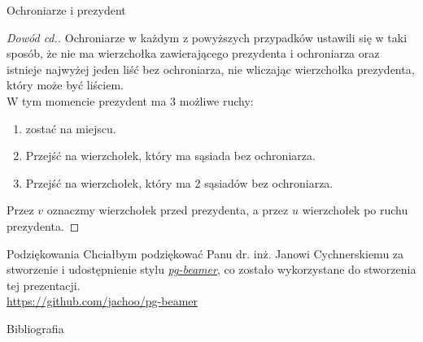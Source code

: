\documentclass[polish]{beamer}
\begin{document}
\begin{frame}{Ochroniarze i prezydent}
    \begin{proof}[Dowód cd.]
        \renewcommand{\qedsymbol}{}
        Ochroniarze w każdym z powyższych przypadków ustawili się w taki sposób, że nie ma wierzchołka zawierającego prezydenta i ochroniarza 
        oraz istnieje najwyżej jeden liść bez ochroniarza, nie wliczając wierzchołka prezydenta, który może być liściem. \\
        \pause
        W tym momencie prezydent ma 3 możliwe ruchy:
        \begin{enumerate}[<+->]
            \item zostać na miejscu.
            \item Przejść na wierzchołek, który ma sąsiada bez ochroniarza.
            \item Przejść na wierzchołek, który ma 2 sąsiadów bez ochroniarza.
        \end{enumerate} 
        \pause
        Przez $v$ oznaczmy wierzchołek przed prezydenta, a przez $u$ wierzchołek po ruchu prezydenta.
    \end{proof}
\end{frame}

\begin{frame}{Podziękowania}
    Chciałbym podziękować Panu dr. inż. Janowi Cychnerskiemu za stworzenie 
    i udostępnienie stylu \href{https://github.com/jachoo/pg-beamer}{\emph{pg-beamer}}, 
    co zostało wykorzystane do stworzenia tej prezentacji.\\
    \url{https://github.com/jachoo/pg-beamer}
     
\end{frame}

\begin{frame}[allowframebreaks]{Bibliografia}
    
    
\end{frame}

\pglastframe


\end{document}
